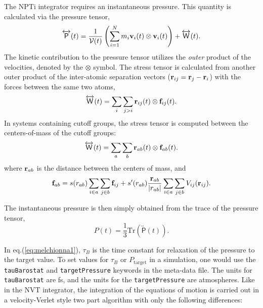 \documentclass[]{book}
\begin{document}
The NPTi integrator requires an instantaneous pressure. This quantity
is calculated via the pressure tensor,
\begin{equation}
\overleftrightarrow{\mathsf{P}}(t) = \frac{1}{\mathcal{V}(t)} \left(
\sum_{i=1}^{N} m_i {\bf v}_i(t) \otimes {\bf v}_i(t) \right) +
\overleftrightarrow{\mathsf{W}}(t).
\end{equation}
The kinetic contribution to the pressure tensor utilizes the {\it
outer} product of the velocities, denoted by the $\otimes$ symbol.  The
stress tensor is calculated from another outer product of the
inter-atomic separation vectors (${\bf r}_{ij} = {\bf r}_j - {\bf
r}_i$) with the forces between the same two atoms,
\begin{equation}
\overleftrightarrow{\mathsf{W}}(t) = \sum_{i} \sum_{j>i} {\bf r}_{ij}(t)
\otimes {\bf f}_{ij}(t).
\end{equation}
In systems containing cutoff groups, the stress tensor is computed
between the centers-of-mass of the cutoff groups:
\begin{equation}
\overleftrightarrow{\mathsf{W}}(t) = \sum_{a} \sum_{b} {\bf r}_{ab}(t)
\otimes {\bf f}_{ab}(t).
\end{equation}
where ${\bf r}_{ab}$ is the distance between the centers of mass, and 
\begin{equation}
{\bf f}_{ab} = s(r_{ab}) \sum_{i \in a} \sum_{j \in b} {\bf f}_{ij} +
s^{\prime}(r_{ab}) \frac{{\bf r}_{ab}}{|r_{ab}|} \sum_{i \in a} \sum_{j
\in b} V_{ij}({\bf r}_{ij}).
\end{equation}

The instantaneous pressure is then simply obtained from the trace of
the pressure tensor,
\begin{equation}
P(t) = \frac{1}{3} \mathrm{Tr} \left( \overleftrightarrow{\mathsf{P}}(t)
\right).
\end{equation}

In eq.(\ref{eq:melchionna1}), $\tau_B$ is the time constant for
relaxation of the pressure to the target value.  To set values for
$\tau_B$ or $P_{\mathrm{target}}$ in a simulation, one would use the
{\tt tauBarostat} and {\tt targetPressure} keywords in the meta-data
file.  The units for {\tt tauBarostat} are fs, and the units for the
{\tt targetPressure} are atmospheres.  Like in the NVT integrator, the
integration of the equations of motion is carried out in a
velocity-Verlet style two part algorithm with only the following
differences:
\end{document}
